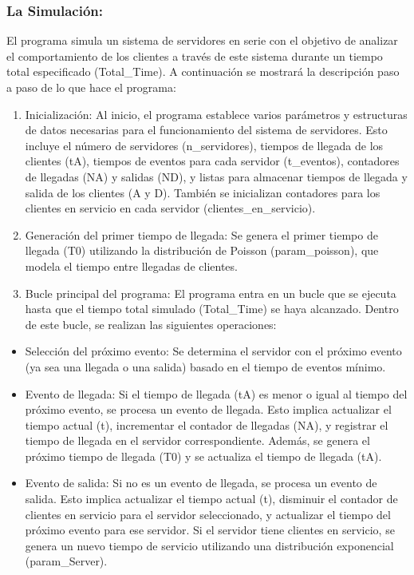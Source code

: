 \documentclass[
]{article}
\providecommand{\tightlist}{%
  \setlength{\itemsep}{0pt}\setlength{\parskip}{0pt}}
\begin{document}
\hypertarget{la-simulaciuxf3n}{%
\subsubsection{La Simulación:}\label{la-simulaciuxf3n}}

El programa simula un sistema de servidores en serie con
el objetivo de analizar el comportamiento de los clientes a través de
este sistema durante un tiempo total especificado (Total\_Time). A
continuación se mostrará la descripción paso a paso de lo que hace el
programa:

\begin{enumerate}
\def\labelenumi{\arabic{enumi}.}
\tightlist
\item
  Inicialización: Al inicio, el programa establece varios parámetros y
  estructuras de datos necesarias para el funcionamiento del sistema de
  servidores. Esto incluye el número de servidores (n\_servidores),
  tiempos de llegada de los clientes (tA), tiempos de eventos para cada
  servidor (t\_eventos), contadores de llegadas (NA) y salidas (ND), y
  listas para almacenar tiempos de llegada y salida de los clientes (A y
  D). También se inicializan contadores para los clientes en servicio en
  cada servidor (clientes\_en\_servicio).
\item
  Generación del primer tiempo de llegada: Se genera el primer tiempo de
  llegada (T0) utilizando la distribución de Poisson (param\_poisson),
  que modela el tiempo entre llegadas de clientes.
\item
  Bucle principal del programa: El programa entra en un bucle que se
  ejecuta hasta que el tiempo total simulado (Total\_Time) se haya
  alcanzado. Dentro de este bucle, se realizan las siguientes
  operaciones:
\end{enumerate}

\begin{itemize}
\tightlist
\item
  Selección del próximo evento: Se determina el servidor con el próximo
  evento (ya sea una llegada o una salida) basado en el tiempo de
  eventos mínimo.
\item
  Evento de llegada: Si el tiempo de llegada (tA) es menor o igual al
  tiempo del próximo evento, se procesa un evento de llegada. Esto
  implica actualizar el tiempo actual (t), incrementar el contador de
  llegadas (NA), y registrar el tiempo de llegada en el servidor
  correspondiente. Además, se genera el próximo tiempo de llegada (T0) y
  se actualiza el tiempo de llegada (tA).
\item
  Evento de salida: Si no es un evento de llegada, se procesa un evento
  de salida. Esto implica actualizar el tiempo actual (t), disminuir el
  contador de clientes en servicio para el servidor seleccionado, y
  actualizar el tiempo del próximo evento para ese servidor. Si el
  servidor tiene clientes en servicio, se genera un nuevo tiempo de
  servicio utilizando una distribución exponencial (param\_Server).
\end{itemize}
\end{document}

